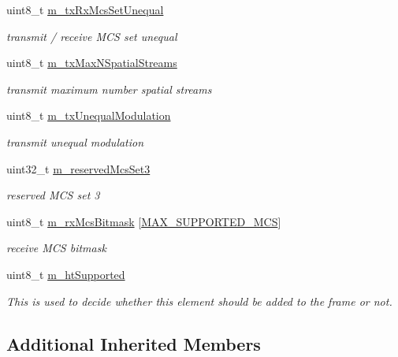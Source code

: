 \begin{DoxyCompactItemize}
uint8\+\_\+t \hyperlink{classns3_1_1HtOperation_af1093beb3dd77ef3b6dfea9a5bef4ff1}{m\+\_\+tx\+Rx\+Mcs\+Set\+Unequal}
\begin{DoxyCompactList}\small\item\em transmit / receive M\+CS set unequal \end{DoxyCompactList}\item 
uint8\+\_\+t \hyperlink{classns3_1_1HtOperation_a813210c18935872268f9cece75ae19f1}{m\+\_\+tx\+Max\+N\+Spatial\+Streams}
\begin{DoxyCompactList}\small\item\em transmit maximum number spatial streams \end{DoxyCompactList}\item 
uint8\+\_\+t \hyperlink{classns3_1_1HtOperation_a70b920516346e7c0b97e0e465643bc51}{m\+\_\+tx\+Unequal\+Modulation}
\begin{DoxyCompactList}\small\item\em transmit unequal modulation \end{DoxyCompactList}\item 
uint32\+\_\+t \hyperlink{classns3_1_1HtOperation_ad9fcc28d4a45ae4e8b2b07bd560b3c28}{m\+\_\+reserved\+Mcs\+Set3}
\begin{DoxyCompactList}\small\item\em reserved M\+CS set 3 \end{DoxyCompactList}\item 
uint8\+\_\+t \hyperlink{classns3_1_1HtOperation_a50f8a0dc63f0fd3076ad1828735c0e7e}{m\+\_\+rx\+Mcs\+Bitmask} \mbox{[}\hyperlink{ht-operation_8h_a309e0519adb78c8fe6aed48ca762e21e}{M\+A\+X\+\_\+\+S\+U\+P\+P\+O\+R\+T\+E\+D\+\_\+\+M\+CS}\mbox{]}
\begin{DoxyCompactList}\small\item\em receive M\+CS bitmask \end{DoxyCompactList}\item 
uint8\+\_\+t \hyperlink{classns3_1_1HtOperation_a2da7e0e5215ffaf8589ba4ba6676a864}{m\+\_\+ht\+Supported}
\begin{DoxyCompactList}\small\item\em This is used to decide whether this element should be added to the frame or not. \end{DoxyCompactList}\end{DoxyCompactItemize}
\subsection*{Additional Inherited Members}


